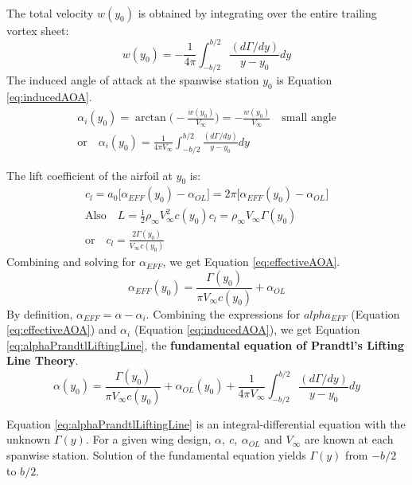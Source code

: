 \documentclass[draft=false, titlepage]{article}
\begin{document}
\paragraph*{} The total velocity $w(y_0)$ is obtained by integrating over the entire trailing vortex sheet:
\begin{equation*}
    w(y_0) = -\frac{1}{4\pi} \int_{-b/2}^{b/2} \frac{(d\Gamma/dy)}{y-y_0}dy
\end{equation*}
The induced angle of attack at the spanwise station $y_0$ is Equation \ref{eq:inducedAOA}.
\begin{gather}
    \alpha_i(y_0) = \arctan \Big( -\frac{w(y_0)}{V_\infty} \Big) = -\frac{w(y_0)}{V_\infty} \quad \text{small angle}\\
    \text{or} \quad \alpha_i(y_0) = \frac{1}{4\pi V_\infty} \int_{-b/2}^{b/2} \frac{(d\Gamma/dy)}{y-y_0}dy
    \label{eq:inducedAOA}
\end{gather}

The lift coefficient of the airfoil at $y_0$ is:
\begin{gather*}
    c_l = a_0 \big[ \alpha_{EFF} (y_0) - \alpha_{OL} \big] = 2\pi \big[ \alpha_{EFF} (y_0) - \alpha_{OL}\big]\\
    \text{Also} \quad L = \frac{1}{2}\rho_\infty V_\infty^2 c(y_0)c_l = \rho_\infty V_\infty \Gamma(y_0)\\
    \text{or} \quad c_l = \frac{2\Gamma(y_0)}{V_\infty c(y_0)}
\end{gather*}
Combining and solving for $\alpha_{EFF}$, we get Equation \ref{eq:effectiveAOA}.
\begin{equation}
    \alpha_{EFF}(y_0) = \frac{\Gamma(y_0)}{\pi V_\infty c(y_0)} + \alpha_{OL}
    \label{eq:effectiveAOA}
\end{equation}
By definition, $\alpha_{EFF} = \alpha - \alpha_i$. Combining the expressions for $alpha_{EFF}$ (Equation \ref{eq:effectiveAOA}) and $\alpha_i$ (Equation \ref{eq:inducedAOA}), we get Equation \ref{eq:alphaPrandtlLiftingLine}, the \textbf{fundamental equation of Prandtl's Lifting Line Theory}.
\begin{equation}
    \alpha(y_0) = \frac{\Gamma(y_0)}{\pi V_\infty c(y_0)} + \alpha_{OL}(y_0) + \frac{1}{4\pi V_\infty} \int_{-b/2}^{b/2} \frac{(d\Gamma/dy)}{y-y_0}dy
    \label{eq:alphaPrandtlLiftingLine}
\end{equation}

Equation \ref{eq:alphaPrandtlLiftingLine} is an integral-differential equation with the unknown $\Gamma(y)$. For a given wing design, $\alpha,\ c,\ \alpha_{OL}$ and $V_\infty$ are known at each spanwise station. Solution of the fundamental equation yields $\Gamma(y)$ from $-b/2$ to $b/2$.
\end{document}
